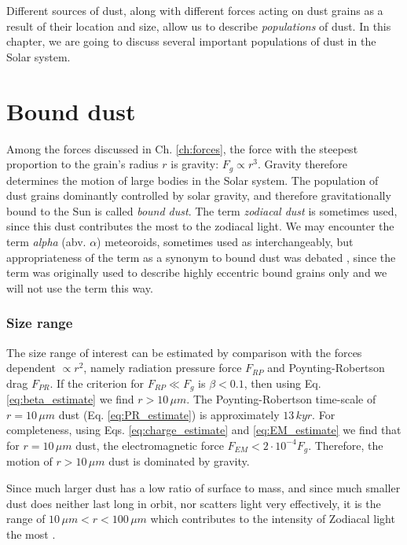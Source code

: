 Different sources of dust, along with different forces acting on dust grains as a result of their location and size, allow us to describe \textit{populations} of dust. In this chapter, we are going to discuss several important populations of dust in the Solar system.

\section{Bound dust}

Among the forces discussed in Ch. \ref{ch:forces}, the force with the steepest proportion to the grain's radius $r$ is gravity: $F_g \propto r^3$. Gravity therefore determines the motion of large bodies in the Solar system. The population of dust grains dominantly controlled by solar gravity, and therefore gravitationally bound to the Sun is called \textit{bound dust}. The term \textit{zodiacal dust} is sometimes used, since this dust contributes the most to the zodiacal light. We may encounter the term \textit{alpha} (abv. $\alpha$) meteoroids, sometimes used as interchangeably, but appropriateness of the term as a synonym to bound dust was debated \citep{sommer2023alpha}, since the term was originally used to describe highly eccentric bound grains only \citep{zook1975source} and we will not use the term this way.

\subsubsection{Size range}

The size range of interest can be estimated by comparison with the forces dependent $\propto r^2$, namely radiation pressure force $F_{RP}$ and Poynting-Robertson drag $F_{PR}$. If the criterion for $F_{RP} \ll F_g$ is $\beta<0.1$, then using Eq. \ref{eq:beta_estimate} we find $r>10 \, \si{\mu m}$. The Poynting-Robertson time-scale of $r=10 \, \si{\mu m}$ dust (Eq. \ref{eq:PR_estimate}) is approximately $13 \, \si{kyr}$. For completeness, using Eqs. \ref{eq:charge_estimate} and \ref{eq:EM_estimate} we find that for $r=10 \, \si{\mu m}$ dust, the electromagnetic force $F_{EM} < 2\cdot 10^{-4} F_g$. Therefore, the motion of $r>10 \, \si{\mu m}$ dust is dominated by gravity.

Since much larger dust has a low ratio of surface to mass, and since much smaller dust does neither last long in orbit, nor scatters light very effectively, it is the range of $10 \, \si{\mu m} < r < 100 \, \si{\mu m}$ which contributes to the intensity of Zodiacal light the most \citep{leinert1981zodiacal}. 

